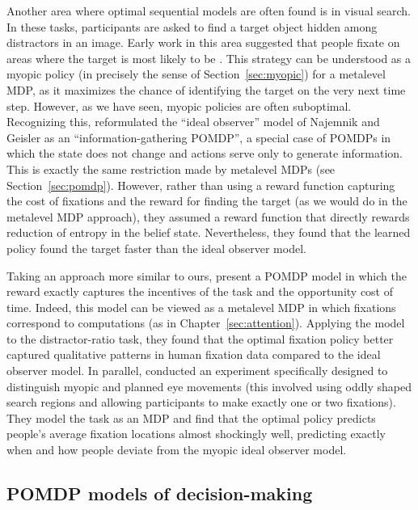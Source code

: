 Another area where optimal sequential models are often found is in visual search. In these tasks, participants are asked to find a target object hidden among distractors in an image. Early work in this area suggested that people fixate on areas where the target is most likely to be \citep{najemnik2005optimal}. This strategy can be understood as a myopic policy (in precisely the sense of Section~\ref{sec:myopic}) for a metalevel MDP, as it maximizes the chance of identifying the target on the very next time step. However, as we have seen, myopic policies are often suboptimal. Recognizing this, \citet{butko2008ipomdp} reformulated the ``ideal observer'' model of Najemnik and Geisler as an ``information-gathering POMDP'', a special case of POMDPs in which the state does not change and actions serve only to generate information. This is exactly the same restriction made by metalevel MDPs (see Section~\ref{sec:pomdp}). However, rather than using a reward function capturing the cost of fixations and the reward for finding the target (as we would do in the metalevel MDP approach), they assumed a reward function that directly rewards reduction of entropy in the belief state. Nevertheless, they found that the learned policy found the target faster than the ideal observer model.

Taking an approach more similar to ours, \citet{acharya2017human} present a POMDP model in which the reward exactly captures the incentives of the task and the opportunity cost of time. Indeed, this model can be viewed as a metalevel MDP in which fixations correspond to computations (as in Chapter~\ref{sec:attention}). Applying the model to the distractor-ratio task, they found that the optimal fixation policy better captured qualitative patterns in human fixation data compared to the ideal observer model. In parallel, \citet{hoppe2019multistep} conducted an experiment specifically designed to distinguish myopic and planned eye movements (this involved using oddly shaped search regions and allowing participants to make exactly one or two fixations). They model the task as an MDP and find that the optimal policy predicts people's average fixation locations almost shockingly well, predicting exactly when and how people deviate from the myopic ideal observer model.

\subsection{POMDP models of decision-making}\label{sec:alternative-pomdp}

